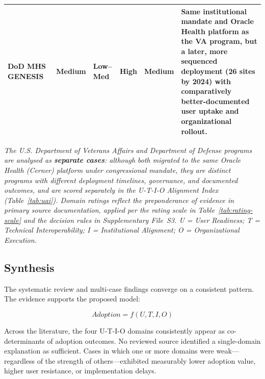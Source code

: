 \begin{table}[H]
\begin{tabular}{p{3.0cm} >{\centering\arraybackslash}p{1.4cm} >{\centering\arraybackslash}p{1.4cm} >{\centering\arraybackslash}p{1.4cm} >{\centering\arraybackslash}p{1.8cm} p{4.8cm}}
\rowcolor{rowgray}
DoD MHS GENESIS~\cite{gao2024dodehr} &
  \cellcolor{medamber}\textcolor{medambertext}{\textbf{Medium}} &
  \cellcolor{lowred}\textcolor{lowredtext}{\textbf{Low--Med}} &
  \cellcolor{highgreen}\textcolor{highgreentext}{\textbf{High}} &
  \cellcolor{medamber}\textcolor{medambertext}{\textbf{Medium}} &
  Same institutional mandate and Oracle Health platform as the VA program, but a later, more sequenced deployment (26 sites by 2024) with comparatively better-documented user uptake and organizational rollout. \\

\bottomrule
\end{tabular}
\vspace{4pt}
{\footnotesize \textit{The U.S. Department of Veterans Affairs and Department of Defense programs are analysed as \textbf{separate cases}: although both migrated to the same Oracle Health (Cerner) platform under congressional mandate, they are distinct programs with different deployment timelines, governance, and documented outcomes, and are scored separately in the U-T-I-O Alignment Index (Table~\ref{tab:uai}). Domain ratings reflect the preponderance of evidence in primary source documentation, applied per the rating scale in Table~\ref{tab:rating-scale} and the decision rules in Supplementary File~S3. U = User Readiness; T = Technical Interoperability; I = Institutional Alignment; O = Organizational Execution.}}
\end{table}

\subsection{Synthesis}

The systematic review and multi-case findings converge on a consistent pattern. The evidence supports the proposed model:

\begin{equation}
Adoption = f(U, T, I, O)
\end{equation}

Across the literature, the four U-T-I-O domains consistently appear as co-determinants of adoption outcomes. No reviewed source identified a single-domain explanation as sufficient. Cases in which one or more domains were weak—regardless of the strength of others—exhibited measurably lower adoption value, higher user resistance, or implementation delays.

